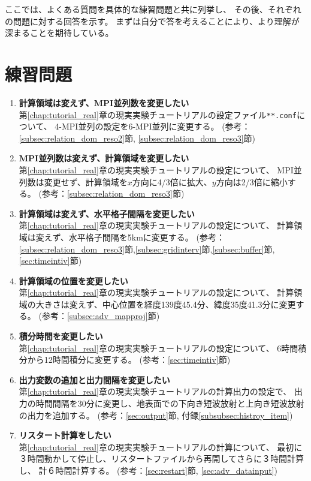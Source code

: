 ここでは、よくある質問を具体的な練習問題と共に列挙し、
その後、それぞれの問題に対する回答を示す。
まずは自分で答を考えることにより、より理解が深まることを期待している。


\section*{練習問題}

\begin{enumerate}
\item {\bf 計算領域は変えず、MPI並列数を変更したい}\\
第\ref{chap:tutorial_real}章の現実実験チュートリアルの設定ファイル\verb|**.conf|について、
4-MPI並列の設定を6-MPI並列に変更する。
(参考：\ref{subsec:relation_dom_reso2}節, \ref{subsec:relation_dom_reso3}節)

\item {\bf MPI並列数は変えず、計算領域を変更したい}\\
第\ref{chap:tutorial_real}章の現実実験チュートリアルの設定について、
MPI並列数は変更せず、計算領域を$x$方向に4/3倍に拡大、$y$方向は2/3倍に縮小する。
(参考：\ref{subsec:relation_dom_reso3}節)

\item {\bf 計算領域は変えず、水平格子間隔を変更したい}\\
第\ref{chap:tutorial_real}章の現実実験チュートリアルの設定について、
計算領域は変えず、水平格子間隔を5kmに変更する。
(参考：\ref{subsec:relation_dom_reso3}節,\ref{subsec:gridinterv}節,\ref{subsec:buffer}節, \ref{sec:timeintiv}節)

\item {\bf 計算領域の位置を変更したい}\\
第\ref{chap:tutorial_real}章の現実実験チュートリアルの設定について、
計算領域の大きさは変えず、中心位置を経度139度45.4分、緯度35度41.3分に変更する。
(参考：\ref{subsec:adv_mapproj}節)

\item {\bf 積分時間を変更したい}\\
第\ref{chap:tutorial_real}章の現実実験チュートリアルの設定について、
6時間積分から12時間積分に変更する。
(参考：\ref{sec:timeintiv}節)

\item {\bf 出力変数の追加と出力間隔を変更したい}\\
第\ref{chap:tutorial_real}章の現実実験チュートリアルの計算出力の設定で、
出力の時間間隔を30分に変更し、地表面での下向き短波放射と上向き短波放射の出力を追加する。
(参考：\ref{sec:output}節, 付録\ref{subsubsec:histroy_item})

\item {\bf リスタート計算をしたい}\\
第\ref{chap:tutorial_real}章の現実実験チュートリアルの計算について、
最初に３時間動かして停止し、リスタートファイルから再開してさらに３時間計算し、
計６時間計算する。
(参考：\ref{sec:restart}節, \ref{sec:adv_datainput})


\end{enumerate}

